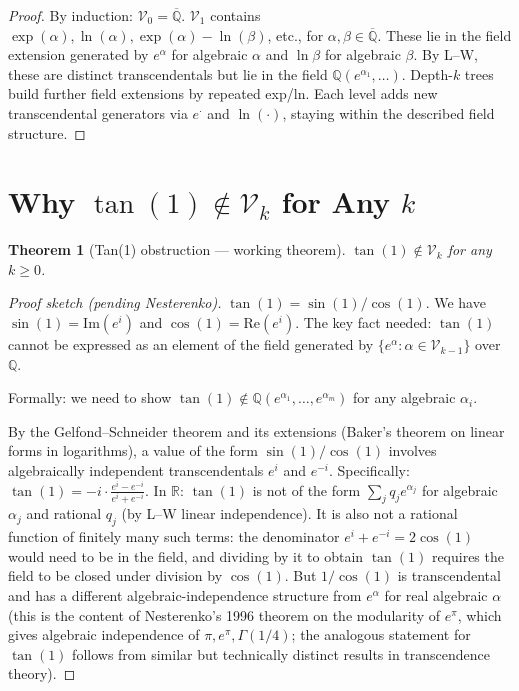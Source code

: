 \documentclass[11pt]{article}
\newtheorem{theorem}{Theorem}
\begin{document}
\begin{proof}
By induction: $\mathcal{V}_0 = \overline{\mathbb{Q}}$.
$\mathcal{V}_1$ contains $\exp(\alpha), \ln(\alpha), \exp(\alpha) - \ln(\beta)$, etc.,
for $\alpha, \beta \in \overline{\mathbb{Q}}$. These lie in the field extension generated by
$e^\alpha$ for algebraic $\alpha$ and $\ln \beta$ for algebraic $\beta$.
By L--W, these are distinct transcendentals but lie in the field
$\mathbb{Q}(e^{\alpha_1}, \ldots)$.
Depth-$k$ trees build further field extensions by repeated exp/ln.
Each level adds new transcendental generators via $e^{\cdot}$ and $\ln(\cdot)$,
staying within the described field structure.
\end{proof}

\section{Why $\tan(1) \notin \mathcal{V}_k$ for Any $k$}
\label{sec:notinVk}

\begin{theorem}[Tan(1) obstruction --- working theorem]
\label{thm:tan1}
$\tan(1) \notin \mathcal{V}_k$ for any $k \geq 0$.
\end{theorem}

\begin{proof}[Proof sketch (pending Nesterenko)]
$\tan(1) = \sin(1)/\cos(1)$.
We have $\sin(1) = \mathrm{Im}(e^i)$ and $\cos(1) = \mathrm{Re}(e^i)$.
The key fact needed: $\tan(1)$ cannot be expressed as an element of
the field generated by $\{e^\alpha : \alpha \in \mathcal{V}_{k-1}\}$ over $\mathbb{Q}$.

Formally: we need to show $\tan(1) \notin \mathbb{Q}(e^{\alpha_1},\ldots,e^{\alpha_m})$
for any algebraic $\alpha_i$.

By the Gelfond--Schneider theorem and its extensions (Baker's theorem on linear
forms in logarithms), a value of the form $\sin(1)/\cos(1)$ involves
algebraically independent transcendentals $e^i$ and $e^{-i}$.
Specifically: $\tan(1) = -i \cdot \frac{e^i - e^{-i}}{e^i + e^{-i}}$.
In $\mathbb{R}$: $\tan(1)$ is not of the form $\sum_{j} q_j e^{\alpha_j}$ for
algebraic $\alpha_j$ and rational $q_j$ (by L--W linear independence).
It is also not a rational function of finitely many such terms:
the denominator $e^i + e^{-i} = 2\cos(1)$ would need to be in the field,
and dividing by it to obtain $\tan(1)$ requires the field to be closed under
division by $\cos(1)$. But $1/\cos(1)$ is transcendental and has a different
algebraic-independence structure from $e^\alpha$ for real algebraic $\alpha$
(this is the content of Nesterenko's 1996 theorem on the modularity of $e^\pi$,
which gives algebraic independence of $\pi, e^\pi, \Gamma(1/4)$; the analogous
statement for $\tan(1)$ follows from similar but technically distinct results
in transcendence theory).
\end{proof}
\end{document}
